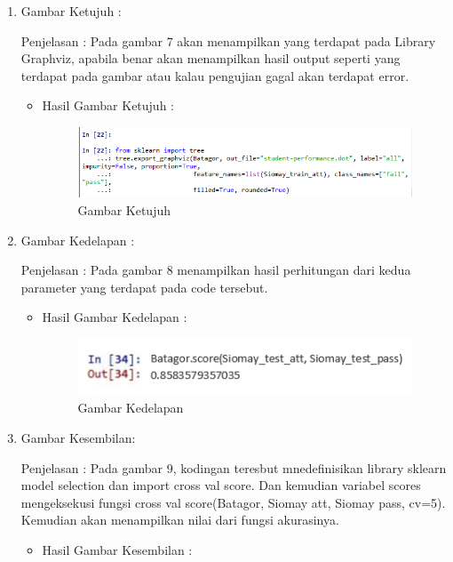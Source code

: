 \begin{itemize}
\begin{enumerate}
\begin{itemize}
\end{itemize}
\item  Gambar Ketujuh :
\par Penjelasan : Pada gambar 7 akan menampilkan yang terdapat pada Library Graphviz, apabila benar akan menampilkan hasil output seperti yang terdapat pada gambar atau kalau pengujian gagal akan terdapat error.
\par 
\begin{itemize}
\par
\item Hasil  Gambar Ketujuh :

\begin{figure}[!hbtp]
\centering
\includegraphics[scale=0.6]{figures/AIP/jd7.PNG}
\caption{ Gambar Ketujuh}
\label{7}
\end{figure}


\end{itemize}
\item  Gambar Kedelapan :
\par Penjelasan : Pada gambar 8 menampilkan hasil perhitungan dari kedua parameter yang terdapat pada code tersebut.
\par 
\begin{itemize}
\par
\item Hasil  Gambar Kedelapan :

\begin{figure}[!hbtp]
\centering
\includegraphics[scale=0.8]{figures/AIP/jd8.PNG}
\caption{ Gambar Kedelapan}
\label{8}
\end{figure}


\end{itemize}
\item  Gambar Kesembilan:
\par Penjelasan : Pada gambar 9, kodingan teresbut mnedefinisikan library sklearn model selection dan import cross val score. Dan kemudian variabel scores mengeksekusi fungsi cross val score(Batagor, Siomay att, Siomay pass, cv=5). Kemudian akan menampilkan nilai dari fungsi akurasinya.
\par 
\begin{itemize}
\par
\item Hasil  Gambar Kesembilan :


\end{itemize}
\end{enumerate}
\end{itemize}
